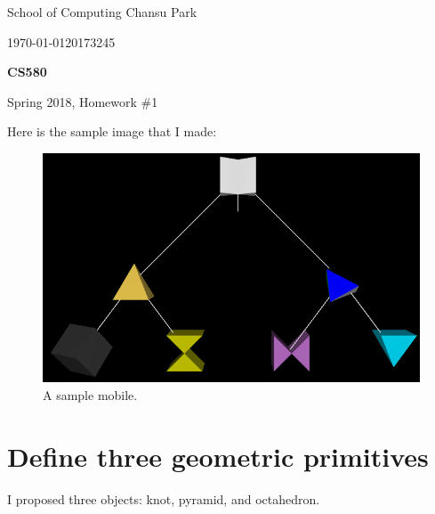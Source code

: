 \documentclass[11pt]{article}
\begin{document}
 



{\large
\noindent School of Computing %
\hfill Chansu Park %

\vspace{.1in}

\noindent \today \hfill 20173245}

\vspace{.25in}

\Large{
\begin{center}
\textbf{CS580}

Spring 2018, Homework \#1
\end{center}
}

\large

Here is the sample image that I made:
\begin{figure}[htb]
	\begin{center}
		\includegraphics[width=0.8\linewidth]{mobile.png}
	\end{center}
	\caption{A sample mobile.}
\end{figure}

\section{Define three geometric primitives} \label{sec:1}
I proposed three objects: knot, pyramid, and octahedron.
\end{document}

